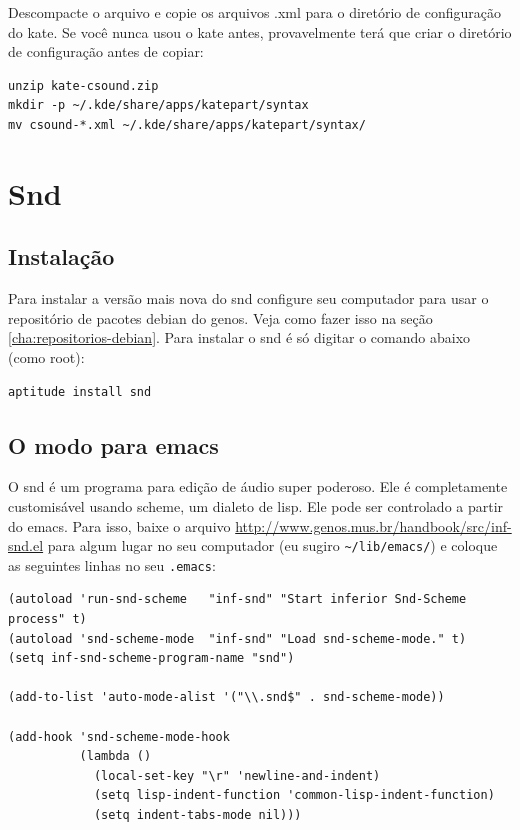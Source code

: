\documentclass[12pt,brazil]{book}
\begin{document}
Descompacte o arquivo e copie os arquivos .xml para o diretório de
configuração do kate. Se você nunca usou o kate antes, provavelmente
terá que criar o diretório de configuração antes de copiar:

\begin{verbatim}
unzip kate-csound.zip
mkdir -p ~/.kde/share/apps/katepart/syntax
mv csound-*.xml ~/.kde/share/apps/katepart/syntax/
\end{verbatim}

\chapter{Snd}
\label{cha:snd}

\section{Instalação}
\label{sec:instalacao-5}

Para instalar a versão mais nova do snd configure seu computador para
usar o repositório de pacotes debian do genos. Veja como fazer isso na
seção \ref{cha:repositorios-debian}. Para instalar o snd é só digitar
o comando abaixo (como root):

\begin{verbatim}
aptitude install snd
\end{verbatim}

\section{O modo para emacs}
\label{sec:o-modo-para-1}

O snd é um programa para edição de áudio super poderoso. Ele é
completamente customisável usando scheme, um dialeto de lisp. Ele pode
ser controlado a partir do emacs. Para isso, baixe o arquivo
\url{http://www.genos.mus.br/handbook/src/inf-snd.el} para algum lugar no seu
computador (eu sugiro \verb|~/lib/emacs/|) e coloque as seguintes
linhas no seu \texttt{.emacs}:

\begin{verbatim}
(autoload 'run-snd-scheme   "inf-snd" "Start inferior Snd-Scheme process" t)
(autoload 'snd-scheme-mode  "inf-snd" "Load snd-scheme-mode." t)
(setq inf-snd-scheme-program-name "snd")

(add-to-list 'auto-mode-alist '("\\.snd$" . snd-scheme-mode))

(add-hook 'snd-scheme-mode-hook
          (lambda ()
            (local-set-key "\r" 'newline-and-indent)
            (setq lisp-indent-function 'common-lisp-indent-function)
            (setq indent-tabs-mode nil)))
\end{verbatim}
\end{document}

